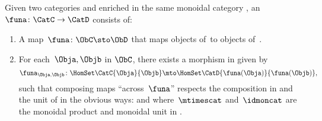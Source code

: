 \begin{ctdefinition}
    \label{def:enrichedfunctor}
    Given two categories \CatC and \CatD enriched in the same monoidal category \CatV, an ~$\funa\colon \CatC \to \CatD$ consists of:
    \begin{enumerate}
        \item A map~$\funa\colon \ObC \sto \ObD$ that maps objects of~\CatC to objects of~\CatD.
        \item For each~$\Obja, \Objb$ in $\ObC$, there exists a morphism in \CatV given by
              \begin{equation}
                  \funa_{\Obja, \Objb} \colon \HomSet\CatC{\Obja}{\Objb} \mto \HomSet\CatD{\funa(\Obja)}{\funa(\Objb)},
              \end{equation}
              such that composing maps ``across~$\funa$'' respects the composition in \CatC and the unit of \CatV in the obvious ways:
              and
              where~$\mtimescat$ and~$\idmoncat$ are the monoidal product and monoidal unit in \CatV.
    \end{enumerate}
\end{ctdefinition}


